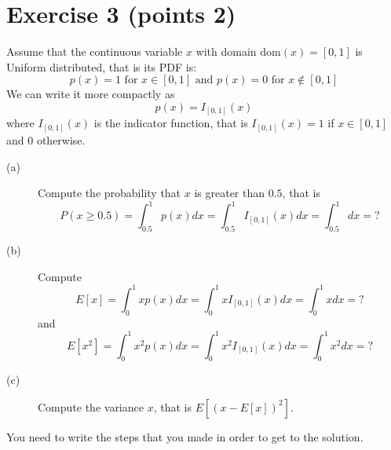 \documentclass[a4paper,10pt]{article}
\begin{document}
\section*{Exercise 3 (points 2)}
Assume that the continuous variable $x$ with domain $ \textrm{dom}(x) =[0,1]$
is Uniform distributed, that is its PDF is:
$$
p(x) = 1 \text{ for } x\in[0,1] \text{ and } p(x) = 0 \text{ for } x\notin[0,1]
$$
We can write it more compactly as 
$$
p(x)=I_{[0,1]}(x)
$$
where $I_{[0,1]}(x)$ is the indicator function, that is
$I_{[0,1]}(x)=1$ if $x \in [0,1]$ and $0$ otherwise.
\begin{description}
 \item[(a)] Compute the probability that $x$ is greater than $0.5$, that
 is
 $$
 P(x\geq 0.5)=\int_{0.5}^1 p(x) dx = \int_{0.5}^1 I_{[0,1]}(x) dx=\int_{0.5}^1  dx = ?
 $$
 \item[(b)] Compute  
 $$
 E[x]=\int_{0}^1 x p(x) dx=\int_{0}^1 x I_{[0,1]}(x) dx =\int_{0}^1 x  dx = ?
 $$ 
 and 
 $$
 E[x^2]=\int_{0}^1 x^2 p(x) dx=\int_{0}^1 x^2 I_{[0,1]}(x) dx =\int_{0}^1 x^2  dx = ?
 $$
 \item[(c)] Compute the variance $x$, that is $E[(x-E[x])^2]$.
\end{description}
You need to write the steps  that you made in order to get to the solution.
\end{document}
